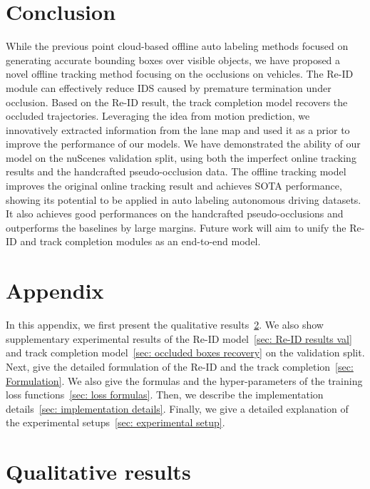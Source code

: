 \documentclass{article} \usepackage{iclr2023_conference,times}
\begin{document}
\vspace{-1mm}
\section{Conclusion}
\vspace{-1mm}
While the previous point cloud-based offline auto labeling methods focused on generating accurate bounding boxes over visible objects, we have proposed a novel offline tracking method focusing on the occlusions on vehicles. The Re-ID module can effectively reduce IDS caused by premature termination under occlusion. Based on the Re-ID result, the track completion model recovers the occluded trajectories. Leveraging the idea from motion prediction, we innovatively extracted information from the lane map and used it as a prior to improve the performance of our models. We have demonstrated the ability of our model on the nuScenes validation split, using both the imperfect online tracking results and the handcrafted pseudo-occlusion data. The offline tracking model improves the original online tracking result and achieves SOTA performance, showing its potential to be applied in auto labeling autonomous driving datasets. It also achieves good performances on the handcrafted pseudo-occlusions and outperforms the baselines by large margins. Future work will aim to unify the Re-ID and track completion modules as an end-to-end model.






\clearpage
\newpage

\appendix
\section*{Appendix}
In this appendix, we first present the qualitative results~\ref{sec: Qualitative results}. We also show supplementary experimental results of the Re-ID model~\ref{sec: Re-ID results val} and track completion model~\ref{sec: occluded boxes recovery} on the validation split. Next, give the detailed formulation of the Re-ID and the track completion~\ref{sec: Formulation}. We also give the formulas and the hyper-parameters of the training loss functions~\ref{sec: loss formulas}. Then, we describe the implementation details~\ref{sec: implementation details}. Finally, we give a detailed explanation of the experimental setups~\ref{sec: experimental setup}. 

\section{Qualitative results}
\label{sec: Qualitative results}
\end{document}
